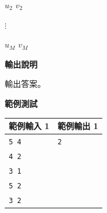     $u_2$ $v_2$

    $\vdots$

    $u_M$ $v_M$

    \textbf{輸出說明}

    輸出答案。

    \textbf{範例測試}

    \begin{tabular}{|m{7cm}|m{7cm}|}
        \hline
        範例輸入 1 & 範例輸出 1 \\
        \hline
        \verb|5 4|  & \verb|2| \\
        \verb|4 2|  & \\
        \verb|3 1|  &\\
        \verb|5 2|  &\\
        \verb|3 2|  &\\
        \hline
    \end{tabular}
